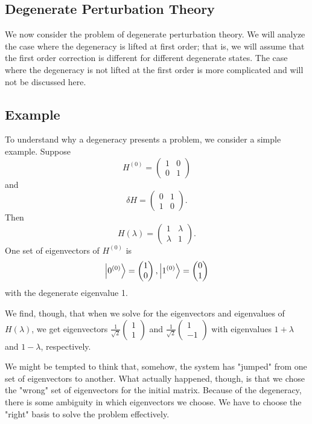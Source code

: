 \subsection {Degenerate Perturbation Theory}
We now consider the problem of degenerate perturbation theory. We will analyze the case where the degeneracy is lifted at first order; that is, we will assume that the first order correction is different for different degenerate states. The case where the degeneracy is not lifted at the first order is more complicated and will not be discussed here. 
\subsection* {Example}
To understand why a degeneracy presents a problem, we consider a simple example. Suppose \[H^{(0)} = \begin{pmatrix} 1 & 0 \\ 0 & 1 \end{pmatrix}\] and \[\delta H = \begin{pmatrix} 0 & 1 \\ 1 & 0 \end{pmatrix}.\] Then \begin{equation}
H (\lambda) = \begin{pmatrix} 1 & \lambda \\ \lambda & 1 \end{pmatrix}.
\end{equation}
One set of eigenvectors of $H^{(0)}$ is 
\[\left| 0^{(0)} \right\rangle = \begin{pmatrix} 1 \\ 0 \end{pmatrix}, \left| 1^{(0)} \right\rangle = \begin{pmatrix} 0 \\ 1 \end{pmatrix} \]
with the degenerate eigenvalue 1. 

We find, though, that when we solve for the eigenvectors and eigenvalues of $H(\lambda)$, we get eigenvectors 
$\frac{1}{\sqrt{2}}\begin{pmatrix}1\\1 \end{pmatrix}$ and $\frac{1}{\sqrt{2}}\begin{pmatrix}1\\-1 \end{pmatrix}$ with eigenvalues $1+\lambda$ and $1-\lambda$, respectively.

We might be tempted to think that, somehow, the system has "jumped" from one set of eigenvectors to another. What actually happened, though, is that we chose the "wrong" set of eigenvectors for the initial matrix. Because of the degeneracy, there is some ambiguity in which eigenvectors we choose. We have to choose the "right" basis to solve the problem effectively. 

